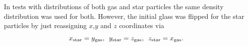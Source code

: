 \documentclass[fleq,usenatbib]{mnras}
\begin{document}
In tests with distributions of both gas and star particles the same density 
distribution was used for both. However, the initial glass was flipped for the 
star particles by just reassigning $x$,$y$ and $z$ coordinates via
 \begin{equation}
 x_{\rm star} = y_{\rm gas}, \hspace{5pt} y_{\rm star} = z_{\rm gas}, 
 \hspace{5pt} z_{\rm star} = x_{\rm gas}.
 \end{equation}

\bsp
\label{lastpage}
\end{document}
